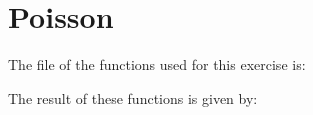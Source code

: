 \section{Poisson}

The file of the functions used for this exercise is:



The result of these functions is given by:



